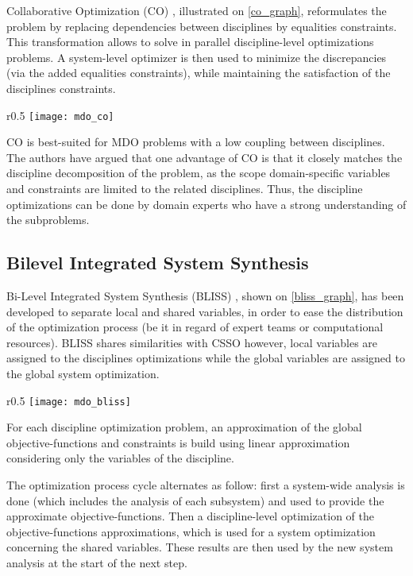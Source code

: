 Collaborative Optimization (CO) \cite{Ilan:1994:MOM:887207}, illustrated on \figurename{} \ref{co_graph}, reformulates the problem by replacing dependencies between disciplines by equalities constraints. This transformation allows to solve in parallel discipline-level optimizations problems. A system-level optimizer is then used to minimize the discrepancies (via the added equalities constraints), while maintaining the satisfaction of the disciplines constraints.

\begin{wrapfigure}{r}{0.5\textwidth}
\centering
\texttt{[image: mdo\_co]}
\caption{CO method}\label{co_graph}
\end{wrapfigure}

CO is best-suited for MDO problems with a low coupling between disciplines. The authors have argued that one advantage of CO is that it closely matches the discipline decomposition of the problem, as the scope domain-specific variables and constraints are limited to the related disciplines. Thus, the discipline optimizations can be done by domain experts who have a strong understanding of the subproblems.

\subsection{Bilevel Integrated System Synthesis}

Bi-Level Integrated System Synthesis (BLISS) \cite{J.:1998:BIS:886310}, shown on \figurename{} \ref{bliss_graph}, has been developed to separate local and shared variables, in order to ease the distribution of the optimization process (be it in regard of expert teams or computational resources).
BLISS shares similarities with CSSO however, local variables are assigned to the disciplines optimizations while the global variables are assigned to the global system optimization.

\begin{wrapfigure}{r}{0.5\textwidth}
\centering
\texttt{[image: mdo\_bliss]}
\caption{BLISS method}\label{bliss_graph}
\end{wrapfigure}

For each discipline optimization problem, an approximation of the global objective-functions and constraints is build using linear approximation considering only the variables of the discipline.

The optimization process cycle alternates as follow: first a system-wide analysis is done (which includes the analysis of each subsystem) and used to provide the approximate objective-functions. Then a discipline-level optimization of the objective-functions approximations, which is used for a system optimization concerning the shared variables. These results are then used by the new system analysis at the start of the next step.

